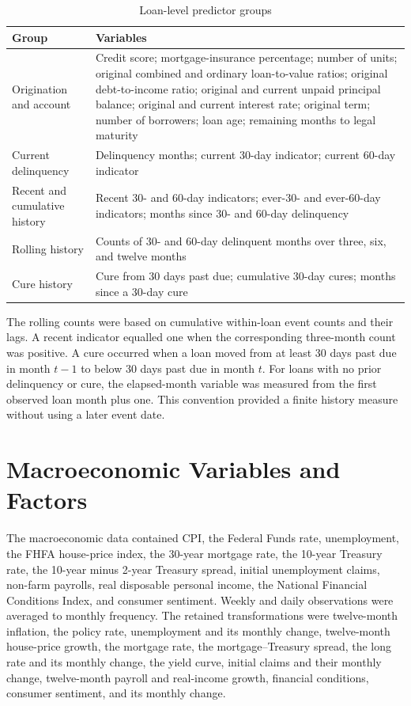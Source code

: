 \begin{table}[htbp]
\centering
\caption{Loan-level predictor groups}
\label{tab:loan-predictors}
\small
\begin{tabular}{L{0.22\textwidth}L{0.66\textwidth}}
\toprule
Group & Variables \\
\midrule
Origination and account & Credit score; mortgage-insurance percentage; number of units; original combined and ordinary loan-to-value ratios; original debt-to-income ratio; original and current unpaid principal balance; original and current interest rate; original term; number of borrowers; loan age; remaining months to legal maturity \\
Current delinquency & Delinquency months; current 30-day indicator; current 60-day indicator \\
Recent and cumulative history & Recent 30- and 60-day indicators; ever-30- and ever-60-day indicators; months since 30- and 60-day delinquency \\
Rolling history & Counts of 30- and 60-day delinquent months over three, six, and twelve months \\
Cure history & Cure from 30 days past due; cumulative 30-day cures; months since a 30-day cure \\
\bottomrule
\end{tabular}
\end{table}

The rolling counts were based on cumulative within-loan event counts and their lags. A recent indicator equalled one when the corresponding three-month count was positive. A cure occurred when a loan moved from at least 30 days past due in month $t-1$ to below 30 days past due in month $t$. For loans with no prior delinquency or cure, the elapsed-month variable was measured from the first observed loan month plus one. This convention provided a finite history measure without using a later event date.

\section{Macroeconomic Variables and Factors}

The macroeconomic data contained CPI, the Federal Funds rate, unemployment, the FHFA house-price index, the 30-year mortgage rate, the 10-year Treasury rate, the 10-year minus 2-year Treasury spread, initial unemployment claims, non-farm payrolls, real disposable personal income, the National Financial Conditions Index, and consumer sentiment. Weekly and daily observations were averaged to monthly frequency. The retained transformations were twelve-month inflation, the policy rate, unemployment and its monthly change, twelve-month house-price growth, the mortgage rate, the mortgage--Treasury spread, the long rate and its monthly change, the yield curve, initial claims and their monthly change, twelve-month payroll and real-income growth, financial conditions, consumer sentiment, and its monthly change.

